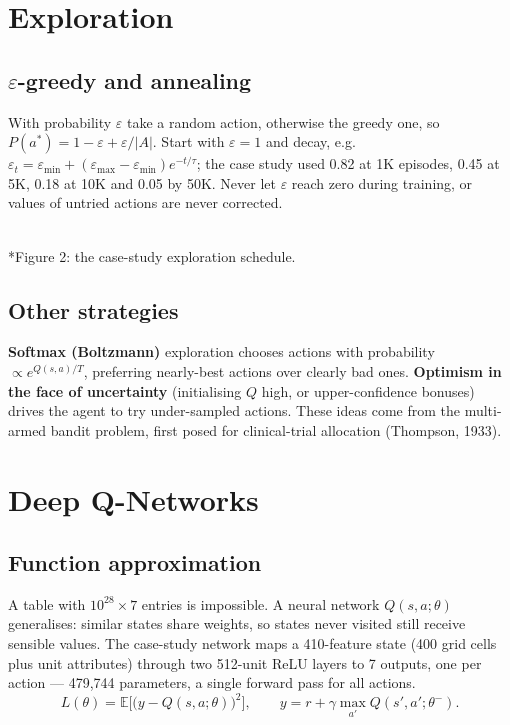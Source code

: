 \documentclass[11pt]{article}
\begin{document}
\section{Exploration}
\subsection{$\varepsilon$-greedy and annealing}
With probability $\varepsilon$ take a random action, otherwise the greedy one, so $P(a^*)=1-\varepsilon+\varepsilon/|A|$. Start with $\varepsilon=1$ and decay, e.g.\ $\varepsilon_t=\varepsilon_{\min}+(\varepsilon_{\max}-\varepsilon_{\min})e^{-t/\tau}$; the case study used 0.82 at 1K episodes, 0.45 at 5K, 0.18 at 10K and 0.05 by 50K. Never let $\varepsilon$ reach zero during training, or values of untried actions are never corrected.
\begin{center}\\*{\small\color{GreyN}Figure 2: the case-study exploration schedule.}\end{center}

\subsection{Other strategies}
\textbf{Softmax (Boltzmann)} exploration chooses actions with probability $\propto e^{Q(s,a)/T}$, preferring nearly-best actions over clearly bad ones. \textbf{Optimism in the face of uncertainty} (initialising $Q$ high, or upper-confidence bonuses) drives the agent to try under-sampled actions. These ideas come from the multi-armed bandit problem, first posed for clinical-trial allocation (Thompson, 1933).

\section{Deep Q-Networks}
\subsection{Function approximation}
A table with $10^{28}\times7$ entries is impossible. A neural network $Q(s,a;\theta)$ generalises: similar states share weights, so states never visited still receive sensible values. The case-study network maps a 410-feature state (400 grid cells plus unit attributes) through two 512-unit ReLU layers to 7 outputs, one per action --- 479,744 parameters, a single forward pass for all actions.
\[L(\theta)=\mathbb E\Big[\big(y-Q(s,a;\theta)\big)^2\Big],\qquad y=r+\gamma\max_{a'}Q(s',a';\theta^-).\]
\end{document}
